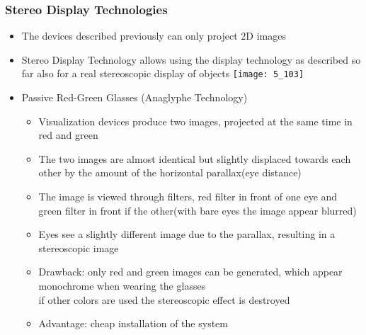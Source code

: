 \documentclass{standalone}
\begin{document}
\subsubsection{Stereo Display Technologies}
\begin{itemize}
	\item The devices described previously can only project 2D images
	\item Stereo Display Technology allows using the display technology as described so far also for a real stereoscopic display of objects
	\texttt{[image: 5\_103]}
	
	\item Passive Red-Green Glasses (Anaglyphe Technology)
	\begin{itemize}
		\item Visualization devices produce two images, projected at the same time in red and green
		\item The two images are almost identical but slightly displaced towards each other by the amount of the horizontal parallax(eye distance)
		\item The image is viewed through filters, red filter in front of one eye and green filter in front if the other(with bare eyes the image appear blurred)
		\item Eyes see a slightly different image due to the parallax, resulting in a stereoscopic image
		\item Drawback: only red and green images can be generated, which appear monochrome when wearing the glasses \\
		if other colors are used the stereoscopic effect is destroyed
		\item Advantage: cheap installation of the system
	\end{itemize}


\end{itemize}
\end{document}
